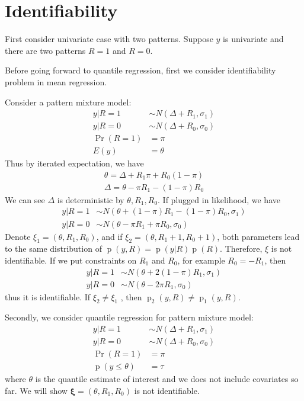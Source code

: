 \documentclass[12pt]{article}
\DeclareMathOperator{\pr}{p}
\DeclareMathOperator{\prob}{Pr}
\begin{document}
\section{Identifiability}

First consider univariate case with two patterns. Suppose $y$ is
univariate and there are two patterns $R = 1$ and $R = 0$.

Before going forward to quantile regression, first we consider
identifiability problem in mean regression.

Consider a pattern mixture model:
\begin{align*}
  y | R = 1 & \sim N(\Delta + R_1 , \sigma_1) \\
  y | R = 0 & \sim N(\Delta + R_0, \sigma_0) \\
  \prob (R = 1) & = \pi \\
  E (y ) & = \theta
\end{align*}
Thus by iterated expectation, we have
\begin{align*}
  \theta = \Delta + R_1\pi + R_0(1-\pi) \\
  \Delta = \theta - \pi R_1 - (1 - \pi)R_0
\end{align*}
We can see $\Delta$ is deterministic by $\theta, R_1, R_0$. If plugged in
likelihood, we have
\begin{align*}
  y | R = 1 & \sim N(\theta + (1 - \pi)R_1 - (1 - \pi)R_0, \sigma_1) \\
  y | R = 0 & \sim N(\theta - \pi R_1 + \pi R_0, \sigma_0)
\end{align*}
Denote $\xi_1 = (\theta , R_1, R_0)$, and if $\xi_2 = (\theta, R_1+ 1, R_0+1)$, both
parameters lead to the same distribution of $\pr(y, R) =
\pr(y|R)\pr(R)$. Therefore, $\xi$ is not identifiable.  If we put
constraints on $R_1$ and $R_0$, for example $R_0 = -R_1$, then
\begin{align*}
  y | R = 1 & \sim N(\theta + 2(1 - \pi)R_1 , \sigma_1) \\
  y | R = 0 & \sim N(\theta - 2\pi R_1 , \sigma_0)
\end{align*}
thus it is identifiable. If $\xi_2 \neq \xi_1$ , then $\pr_2(y, R) \neq \pr_1(y,
R)$.

Secondly, we consider quantile regression for pattern mixture model:
\begin{align*}
  y | R = 1 & \sim N(\Delta + R_1 , \sigma_1) \\
  y | R = 0 & \sim N(\Delta + R_0, \sigma_0) \\
  \prob (R = 1) & = \pi \\
  \pr (y \leq \theta ) & = \tau
\end{align*}
where $\theta$ is the quantile estimate of interest and we does not include
covariates so far. We will show $\bm \xi = (\theta, R_1, R_0) $ is not
identifiable.
\end{document}
